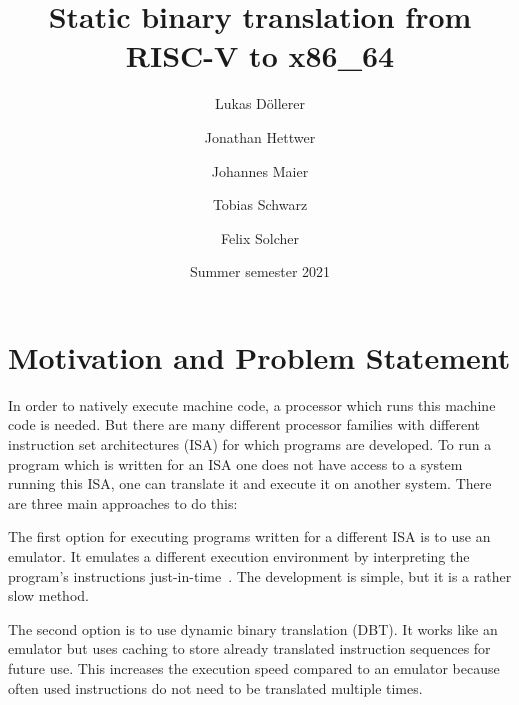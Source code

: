 \documentclass[course=eragp]{aspdoc}
\author{Lukas Döllerer \and Jonathan Hettwer \and Johannes Maier \and Tobias Schwarz \and Felix Solcher}
\date{Summer semester 2021}
\title{Static binary translation from RISC-V to x86\_64}
\begin{document}
\maketitle

\tableofcontents

\pagebreak

\section{Motivation and Problem Statement}



In order to natively execute machine code, a processor which runs this machine code is needed. But
there are many different processor families with different instruction set architectures (ISA) for
which programs are developed. To run a program which is written for an ISA one does not have access
to a system running this ISA, one can translate it and execute it on another system. There are three
main approaches to do this:

\par

The first option for executing programs written for a different ISA is to use an emulator. It
emulates a different execution environment by interpreting the program's instructions
just-in-time~\cite{binary_translation}.
The development is simple, but it is a rather slow method.

\par

The second option is to use dynamic binary translation (DBT). It works like an emulator but uses caching
to store already translated instruction sequences for future use. This increases the execution speed
compared to an emulator because often used instructions do not need to be translated
multiple times.~\cite{binary_translation}

\par
\end{document}
